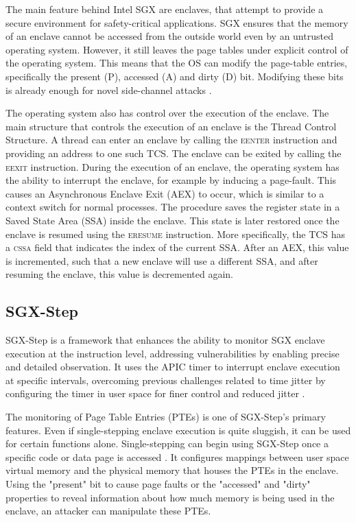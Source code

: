 \documentclass{llncs}
\begin{document}
The main feature behind Intel SGX are enclaves,
that attempt to provide a secure environment for safety-critical applications.
SGX ensures that the memory of an enclave cannot be accessed from the outside world
even by an untrusted operating system.
However, it still leaves the page tables under explicit control of the operating system.
This means that the OS can modify the page-table entries,
specifically the present (P), accessed (A) and dirty (D) bit.
Modifying these bits is already enough for novel side-channel attacks \cite{TODO}.

The operating system also has control over the execution of the enclave.
The main structure that controls the execution of an enclave is the Thread Control Structure.
A thread can enter an enclave by calling the \textsc{eenter} instruction and providing an address to one such TCS.
The enclave can be exited by calling the \textsc{eexit} instruction.
During the execution of an enclave,
the operating system has the ability to interrupt the enclave,
for example by inducing a page-fault.
This causes an Asynchronous Enclave Exit (AEX) to occur,
which is similar to a context switch for normal processes.
The procedure saves the register state in a Saved State Area (SSA) inside the enclave.
This state is later restored once the enclave is resumed using the \textsc{eresume} instruction.
More specifically, the TCS has a \textsc{cssa} field that indicates the index of the current SSA.
After an AEX, this value is incremented, such that a new enclave will use a different SSA,
and after resuming the enclave, this value is decremented again.

\subsection{SGX-Step}
SGX-Step \cite{BulckPS17} is a framework that enhances the ability to monitor SGX enclave execution at the instruction level, addressing vulnerabilities by enabling precise and detailed observation. It uses the APIC timer to interrupt enclave execution at specific intervals, overcoming previous challenges related to time jitter by configuring the timer in user space for finer control and reduced jitter \cite{ArnautovTGKMPLM16}.

The monitoring of Page Table Entries (PTEs) is one of SGX-Step's primary features. Even if single-stepping enclave execution is quite sluggish, it can be used for certain functions alone. Single-stepping can begin using SGX-Step once a specific code or data page is accessed \cite{BulckWKPS17}. It configures mappings between user space virtual memory and the physical memory that houses the PTEs in the enclave. Using the "present" bit to cause page faults \cite{XuCP15} or the "accessed" and "dirty" properties to reveal information about how much memory is being used in the enclave, an attacker can manipulate these PTEs.
\end{document}
